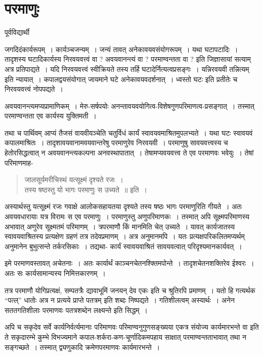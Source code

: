 {\fontsize{15}{17}\selectfont
\chapter{परमाणुः}

\begin{center}
\smallskip
पूर्वविद्यार्थी
\addrule
\end{center}
जगदिदंकार्यरूपम्~। कार्यञ्चजन्यम्~। जन्यं तावत् अनेकावयवसंयोगरूपम्~। यथा घटापटादिः~। तादृशस्य घटादिकार्यस्य निरवयवत्त्वं वा ? अवयवानन्त्यं वा ? परमाण्वन्तता वा ? इति जिज्ञासायां सत्याम् अत्र प्रतिपाद्यते~। यदि निरवयवत्त्वं स्वीक्रियते तस्य तर्हि घटादेर्नित्यत्वप्रसङ्गः~। यन्निरवयवी तन्नित्यम् इति न्यायात्~। कपालद्वयसंयोगात् जायमाने घटे अनेकावयवदर्शनात्~। ध्वस्तो घटः इति प्रतीतेः च निरवयवत्त्वं नोपपद्यते~। 

अवयवानन्त्यमप्यप्रामाणिकम्~। मेरु-सर्षपयोः अनन्तावयवयोगित्व-विशेषगुणपरिमाण\-त्व-प्रसङ्गात्~। तस्मात् परमाण्वन्तता एव कार्यस्य युक्तिमती~। 

तथा च पार्थिवम् आप्यं तैजसं वायवीयञ्चेति चतुर्विधं कार्यं स्वावयवमाश्रितमुपलभ्यते~। यथा घटः स्वावयवं कपालमाश्रितः~। तादृशावयवानामवयवान्तरेषु परमाणुरेव निरवयवी~। परमाणुषु सावयवत्त्वस्य च हेतोरसिद्धत्वात् न अवयवानन्त्यकल्पना अनवस्थापातात्~। तेषामप्यवयवत्त्व ते एव परमाणवः भवेयुः~। तेषां परिमाणमाह-
\begin{verse}
जालसूर्यमरीचिस्थं यत्सूक्ष्मं दृश्यते रजः~। \\
तस्य षष्ठस्तु यो भागः परमाणुः स उच्यते~॥ इति~। 
\end{verse}
अस्यार्थस्तु यत्सूक्ष्मं रजः गवाक्षे आलोकसहायतया दृश्यते तस्य षष्ठः भागः परमाणुरिति गीयते~। अतः अवयवधारायाः यत्र विरामः स एव परमाणुः~। परमाणुस्तु अणुपरिमाणकः~। तस्मात् अपि सूक्ष्मपरिमाणस्य अभावात् अणुरेव सूक्ष्मतमं परिमाणम्~। त्रपरमाणौ किं मानमिति चेत् उच्यते~। यावत् कार्यजातस्य स्वावयवाश्रितस्य प्रत्यक्षेण ग्रहणं तत्र तदेवप्रमाणम्~। अत्र अनुमानमपि~। यतः प्रत्यक्षपरिकलितमप्यर्थम् अनुमानेन बुभुत्सन्ते तर्करसिकाः~। तद्यथा- कार्यं स्वावयवाश्रितं सावयवत्वात् परिदृश्यमानकार्यवत्~। 

इमे परमाणवस्तावत् अचेतनाः~। अतः कार्यार्थं काञ्चनचेतनश्क्तिमपोन्ते~। तादृशचेतनशक्तिरेव ईश्वरः~। अतः सः कार्यसामान्यस्य निमित्तकारणम्~। 

तत्र परमाणौ योगिप्रत्यक्षं, सम्पतत्रैः द्यावाभूमिं जनयन् देव एकः इति च श्रुतिरपि प्रमाणम्~। यतो हि गत्यर्थक “पत्ल्” धातोः अत्र न प्रत्यये प्राप्ते पतत्रम् इति शब्दः निष्पद्यते~। गतिशीलत्वम् अस्यार्थः~। अनेन सततगतिशीलाः परमाणवः पतत्रशब्देन लक्ष्यन्ते इति सिद्धम्~। 

अपि च सकृदेव सर्वे कार्यनिर्वर्त्यमानाः परिमाणवः परिमाण्वनुगुणसङ्ख्यया एकत्र संयोज्य कार्यमारभन्ते वा इति ते सकृदारम्भे कुम्भे विभज्यमाने कपाल-शर्करा-कण-चूर्णादिकमपहाय साक्षात् परमाण्वन्तताभावात् तथा न सङ्गच्छते~। तस्मात् द्व्यणुकादि क्रमेणपरमाणवः कार्यमारभन्ते~। 

}
